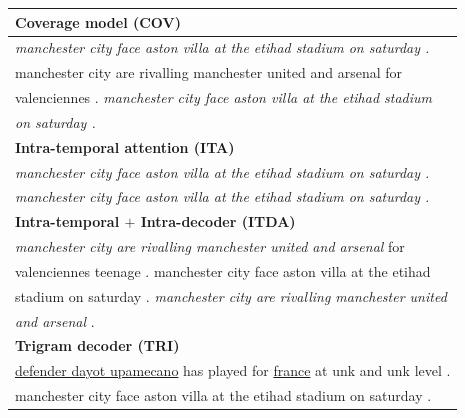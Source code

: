 \begin{table}[th]
\begin{center}
\scriptsize
\begin{tabular}{|l|}%

\hline \bf Coverage model (COV) \\
\hline \textit{manchester city face aston villa at the etihad stadium on saturday .} \\
       manchester city are rivalling manchester united and arsenal for \\
	   valenciennes . \textit{ manchester city face aston villa at the etihad stadium}\\
	   \textit{on saturday .}\\
\hline \bf Intra-temporal attention (ITA) \\
\hline \textit{manchester city face aston villa at the etihad stadium on saturday .} \\
	   \textit{manchester city face aston villa at the etihad stadium on saturday .}\\
\hline \bf Intra-temporal $+$ Intra-decoder (ITDA) \\
\hline \textit{manchester city are rivalling manchester united and arsenal }for \\
       valenciennes teenage . manchester city face aston villa at the etihad \\
	   stadium on saturday . \textit{manchester city are rivalling manchester united}\\
	   \textit{and arsenal }. \\
\hline \bf Trigram decoder (TRI) \\
\hline \underline{defender dayot upamecano} has played for \underline{france} 
at unk and unk level .\\ 
       manchester city face aston villa at the etihad stadium on saturday . \\

\end{tabular}
\end{center}
\end{table}
